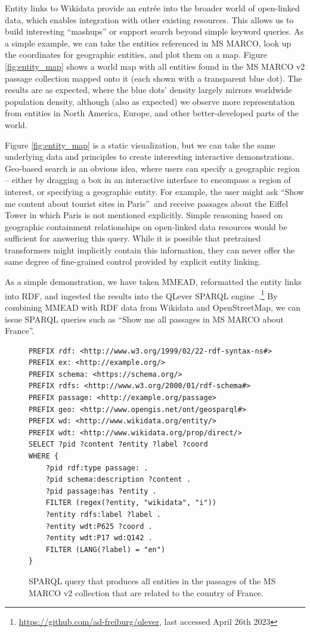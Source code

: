 Entity links to Wikidata provide an entr\'ee into the broader world of open-linked data, which enables integration with other existing resources.
This allows us to build interesting ``mashups'' or support search beyond simple keyword queries.
As a simple example, we can take the entities referenced in MS MARCO, look up the coordinates for geographic entities, and plot them on a map. 
Figure \ref{fig:entity_map} shows a world map with all entities found in the MS MARCO v2 passage collection mapped onto it (each shown with a transparent blue dot).
The results are as expected, where the blue dots' density largely mirrors worldwide population density, although (also as expected) we observe more representation from entities in North America, Europe, and other better-developed parts of the world.

Figure \ref{fig:entity_map} is a static visualization, but we can take the same underlying data and principles to create interesting interactive demonstrations.
Geo-based search is an obvious idea, where users can specify a geographic region -- either by dragging a box in an interactive interface to encompass a region of interest, or specifying a geographic entity.
For example, the user might ask ``Show me content about tourist sites in Paris''\ and receive passages about the Eiffel Tower in which Paris is not mentioned explicitly.
Simple reasoning based on geographic containment relationships on open-linked data resources would be sufficient for answering this query.
While it is possible that pretrained transformers might implicitly contain this information, they can never offer the same degree of fine-grained control provided by explicit entity linking.

As a simple demonstration, we have taken MMEAD, reformatted the entity links into RDF, and ingested the results into the QLever SPARQL engine~\citep{qlever}.\footnote{\url{https://github.com/ad-freiburg/qlever}, last accessed April 26th 2023}
By combining MMEAD with RDF data from Wikidata and OpenStreetMap, we can issue SPARQL queries such as ``Show me all passages in MS MARCO about France''.

\begin{figure}
	\centering
	\begin{verbatim}
PREFIX rdf: <http://www.w3.org/1999/02/22-rdf-syntax-ns#>
PREFIX ex: <http://example.org/> 
PREFIX schema: <https://schema.org/>
PREFIX rdfs: <http://www.w3.org/2000/01/rdf-schema#>
PREFIX passage: <http://example.org/passage> 
PREFIX geo: <http://www.opengis.net/ont/geosparql#>
PREFIX wd: <http://www.wikidata.org/entity/>
PREFIX wdt: <http://www.wikidata.org/prop/direct/>
SELECT ?pid ?content ?entity ?label ?coord 
WHERE {
	?pid rdf:type passage: .
	?pid schema:description ?content .
	?pid passage:has ?entity .
	FILTER (regex(?entity, "wikidata", "i"))
	?entity rdfs:label ?label .
	?entity wdt:P625 ?coord .
	?entity wdt:P17 wd:Q142 .
	FILTER (LANG(?label) = "en")
}
	\end{verbatim}
	\caption{SPARQL query that produces all entities in the passages of the MS MARCO v2 collection that are related to the country of France.}
	\label{fig:code_sparql}
\end{figure}


